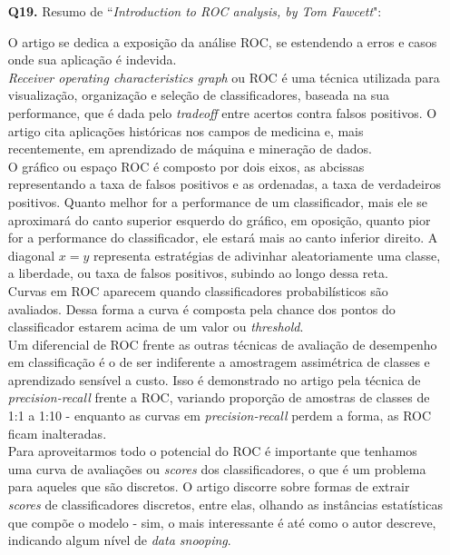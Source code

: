 \documentclass[12pt]{article}
\begin{document}
\begin{enumerate}
\pagebreak

\item [\textbf{Q19.}] Resumo de ``\textit{Introduction to ROC analysis, by Tom Fawcett}":
	\begin{addmargin}[1em]{2em}
	O artigo se dedica a exposição da análise ROC, se estendendo a erros e casos onde sua aplicação é indevida.\\
	\textit{Receiver operating characteristics graph} ou ROC é uma técnica utilizada para visualização, organização e seleção de classificadores, baseada na sua performance, que é dada pelo \textit{tradeoff} entre acertos contra falsos positivos. O artigo cita aplicações históricas nos campos de medicina e, mais recentemente, em aprendizado de máquina e mineração de dados.\\
	O gráfico ou espaço ROC é composto por dois eixos, as abcissas representando a taxa de falsos positivos e as ordenadas, a taxa de verdadeiros positivos. Quanto melhor for a performance de um classificador, mais ele se aproximará do canto superior esquerdo do gráfico, em oposição, quanto pior for a performance do classificador, ele estará mais ao canto inferior direito. A diagonal $x=y$ representa estratégias de adivinhar aleatoriamente uma classe, a liberdade, ou taxa de falsos positivos, subindo ao longo dessa reta.\\
	Curvas em ROC aparecem quando classificadores probabilísticos são avaliados. Dessa forma a curva é composta pela chance dos pontos do classificador estarem acima de um valor ou \textit{threshold}.\\
	Um diferencial de ROC frente as outras técnicas de avaliação de desempenho em classificação é o de ser indiferente a amostragem assimétrica de classes e aprendizado sensível a custo. Isso é demonstrado no artigo pela técnica de \textit{precision-recall} frente a ROC, variando proporção de amostras de classes de 1:1 a 1:10 - enquanto as curvas em \textit{precision-recall} perdem a forma, as ROC ficam inalteradas.\\
	Para aproveitarmos todo o potencial do ROC é importante que tenhamos uma curva de avaliações ou \textit{scores} dos classificadores, o que é um problema para aqueles que são discretos. O artigo discorre sobre formas de extrair \textit{scores} de classificadores discretos, entre elas, olhando as instâncias estatísticas que compõe o modelo - sim, o mais interessante é até como o autor descreve, indicando algum nível de \textit{data snooping}.\\

\end{addmargin}
\end{enumerate}
\end{document}
